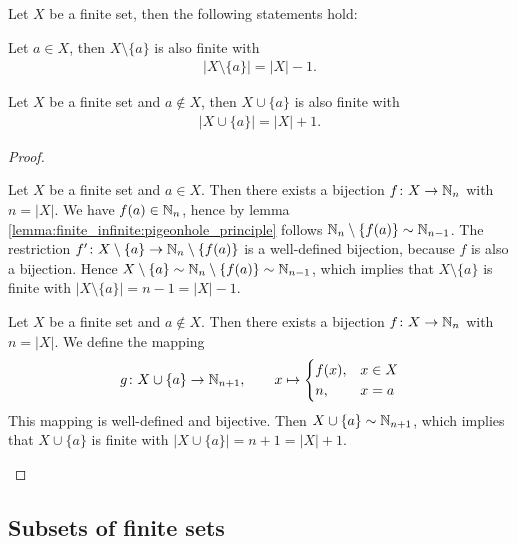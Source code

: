\begin{theorem}
    Let $X$ be a finite set, then the following statements hold:
    \begin{intheoremenumerate}
        \item\label{theorem:finite_infinite:less_one} Let $a\in X$, then $X\setminus\{a\}$ is also finite with \begin{align}|X\setminus\{a\}|=|X|-1.\end{align}
        \item\label{theorem:finite_infinite:plus_one} Let $X$ be a finite set and $a\notin X$, then $X\cup\{a\}$ is also finite with \begin{align}|X\cup\{a\}|=|X|+1.\end{align}
    \end{intheoremenumerate}
\end{theorem}
\begin{proof}
    \begin{proofenumerate}
        \item Let $X$ be a finite set and $a\in X$. Then there exists a bijection $f\colon X\to\mathbb{N}_n$ with $n=|X|$. We have $f(a)\in\mathbb{N}_n$, hence by lemma \ref{lemma:finite_infinite:pigeonhole_principle} follows $\mathbb{N}_n\setminus\{f(a)\}\sim\mathbb{N}_{n-1}$. The restriction $f'\colon X\setminus\{a\}\to \mathbb{N}_n\setminus\{f(a)\}$ is a well-defined bijection, because $f$ is also a bijection. Hence $X\setminus\{a\}\sim \mathbb{N}_n\setminus\{f(a)\}\sim \mathbb{N}_{n-1}$, which implies that $X\setminus\{a\}$ is finite with $|X\setminus\{a\}|=n-1=|X|-1$.
        
        \item Let $X$ be a finite set and $a\notin X$. Then there exists a bijection $f\colon X\to\mathbb{N}_n$ with $n=|X|$. We define the mapping
        \begin{align}g\colon X\cup\{a\}\to\mathbb{N}_{n+1},\qquad x\mapsto \begin{cases}f(x), & x\in X \\ n, & x=a\end{cases}\end{align}
        This mapping is well-defined and bijective. Then $X\cup\{a\}\sim\mathbb{N}_{n+1}$, which implies that $X\cup\{a\}$ is finite with $|X\cup\{a\}|=n+1=|X|+1$.
    \end{proofenumerate}
\end{proof}

\subsection{Subsets of finite sets}

